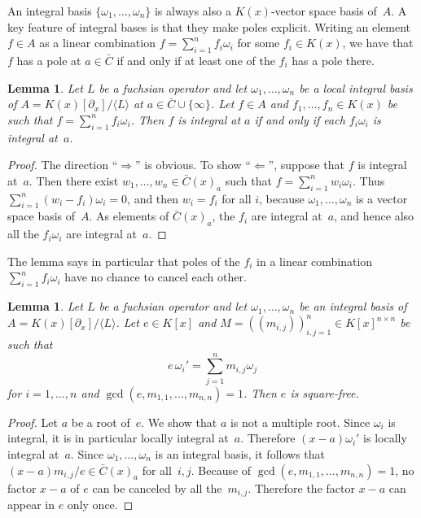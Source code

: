 \documentclass{sig-alternate}
\newtheorem{lemma}[theorem]{Lemma}
\def\<#1>{\langle#1\rangle}
\begin{document}
An integral basis $\{\omega_1,\dots,\omega_n\}$ is always also a $K(x)$-vector space
basis of~$A$. A key feature of integral bases is that they make poles explicit. Writing
an element $f\in A$ as a linear combination $f=\sum_{i=1}^n f_i\omega_i$ for some
$f_i\in K(x)$, we have that $f$ has a pole at $a\in\bar C$ if and only if at least one
of the $f_i$ has a pole there.

\begin{lemma}\label{lemma:1}
  Let $L$ be a fuchsian operator and let
  $\omega_1,\dots,\omega_n$ be a local integral basis of $A=K(x)[\partial_x]/\<L>$ at $a\in\bar C\cup\{\infty\}$.
  Let $f\in A$ and $f_1,\dots,f_n\in K(x)$ be such that $f=\sum_{i=1}^nf_i\omega_i$.
  Then $f$ is integral at $a$ if and only if each $f_i\omega_i$ is integral at~$a$.
\end{lemma}
\begin{proof}
  The direction ``$\Rightarrow$'' is obvious. To show ``$\Leftarrow$'', suppose
  that $f$ is integral at~$a$. Then there exist $w_1,\dots,w_n\in\bar C(x)_a$ such that
  $f=\sum_{i=1}^nw_i\omega_i$. Thus $\sum_{i=1}^n(w_i-f_i)\omega_i=0$, and then
  $w_i=f_i$ for all $i$, because $\omega_1,\dots,\omega_n$ is a vector space basis of~$A$.
  As elements of $\bar C(x)_a$, the $f_i$ are integral at~$a$, and hence also all the $f_i\omega_i$
  are integral at~$a$.
\end{proof}

The lemma says in particular that poles of the $f_i$ in a linear combination
$\sum_{i=1}^n f_i\omega_i$ have no chance to cancel each other.

\begin{lemma}\label{lemma:e}
  Let $L$ be a fuchsian operator and let
  $\omega_1,\dots,\omega_n$ be an integral basis of $A=K(x)[\partial_x]/\<L>$.
  Let $e\in K[x]$ and
  $M=((m_{i,j}))_{i,j=1}^n\in K[x]^{n\times n}$ be such that
  \[
    e\,\omega_i'=\sum_{j=1}^n m_{i,j}\omega_j
  \]
  for $i=1,\dots,n$ and $\gcd(e,m_{1,1},\dots,m_{n,n})=1$.
  Then $e$ is square-free.
\end{lemma}
\begin{proof}
  Let $a$ be a root of~$e$. We show that $a$ is not a multiple root.
  Since $\omega_i$ is integral, it is in particular locally integral at~$a$.
  Therefore $(x-a)\omega_i'$ is locally integral at~$a$.
  Since $\omega_1,\dots,\omega_n$ is an integral basis, it follows that
  $(x-a)m_{i,j}/e\in\bar C(x)_a$ for all~$i,j$.
  Because of $\gcd(e,m_{1,1},\dots,m_{n,n})=1$, no factor $x-a$ of $e$
  can be canceled by all the~$m_{i,j}$.
  Therefore the factor $x-a$ can appear in $e$ only once.
\end{proof}
\end{document}
